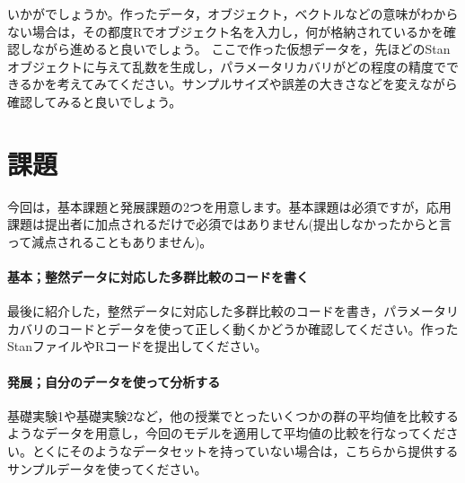 \documentclass{ltjsbook}
\begin{document}
いかがでしょうか。作ったデータ，オブジェクト，ベクトルなどの意味がわからない場合は，その都度Rでオブジェクト名を入力し，何が格納されているかを確認しながら進めると良いでしょう。
ここで作った仮想データを，先ほどのStanオブジェクトに与えて乱数を生成し，パラメータリカバリがどの程度の精度でできるかを考えてみてください。サンプルサイズや誤差の大きさなどを変えながら確認してみると良いでしょう。
\section{課題}
今回は，基本課題と発展課題の2つを用意します。基本課題は必須ですが，応用課題は提出者に加点されるだけで必須ではありません(提出しなかったからと言って減点されることもありません)。

\paragraph{基本；整然データに対応した多群比較のコードを書く}最後に紹介した，整然データに対応した多群比較のコードを書き，パラメータリカバリのコードとデータを使って正しく動くかどうか確認してください。作ったStanファイルやRコードを提出してください。
\paragraph{発展；自分のデータを使って分析する}基礎実験1や基礎実験2など，他の授業でとったいくつかの群の平均値を比較するようなデータを用意し，今回のモデルを適用して平均値の比較を行なってください。とくにそのようなデータセットを持っていない場合は，こちらから提供するサンプルデータを使ってください。
\end{document}
